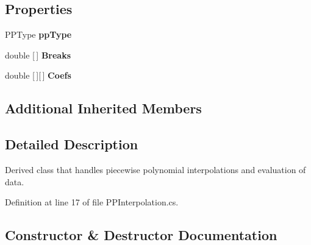 \subsection*{Properties}
\begin{DoxyCompactItemize}
\item 
\mbox{\label{class_isotope_fit_1_1_p_p_interpolation_a0e77da81cfa5f6377e81d5855ee82a32}} 
P\+P\+Type {\bfseries pp\+Type}
\item 
\mbox{\label{class_isotope_fit_1_1_p_p_interpolation_ac9ccf388cee3f262e6db2c6ba757429d}} 
double \mbox{[}$\,$\mbox{]} {\bfseries Breaks}
\item 
\mbox{\label{class_isotope_fit_1_1_p_p_interpolation_ae7548d6f546a8b4ac1b1d6f4e70d7819}} 
double \mbox{[}$\,$\mbox{]}\mbox{[}$\,$\mbox{]} {\bfseries Coefs}
\end{DoxyCompactItemize}
\subsection*{Additional Inherited Members}


\subsection{Detailed Description}
Derived class that handles piecewise polynomial interpolations and evaluation of data. 



Definition at line 17 of file P\+P\+Interpolation.\+cs.



\subsection{Constructor \& Destructor Documentation}
\mbox{\label{class_isotope_fit_1_1_p_p_interpolation_afaeb635a338f06714d3b12e3865ac4f2}} 
